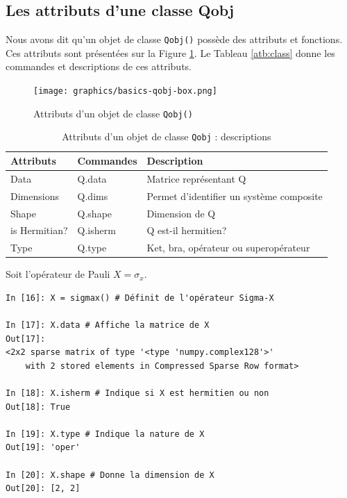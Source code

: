 \begin{itemize}
\subsection{Les attributs d'une classe Qobj}

Nous avons dit qu'un objet de classe \texttt{Qobj()} possède des attributs et 
fonctions. Ces attributs sont présentées sur la Figure \ref{fig:qobj}. Le 
Tableau \ref{atb:class} donne les commandes et descriptions de ces attributs.

\begin{figure}[htbp]
\centering
 \texttt{[image: graphics/basics-qobj-box.png]}
\caption{Attributs d'un objet de classe \texttt{Qobj()}}
\label{fig:qobj}
\end{figure}

\begin{table}[htpb]
\centering
\begin{tabular}{|l|l|l|} \hline \hline
\textbf{Attributs} &\textbf{Commandes}	&\textbf{Description}\\ \hline \hline
Data	&Q.data	&Matrice représentant Q\\ \hline
Dimensions	&Q.dims	&Permet d'identifier un système composite\\ \hline
Shape	&Q.shape	&Dimension de Q\\ \hline
is Hermitian?	&Q.isherm	&Q est-il hermitien?\\ \hline
Type	&Q.type	&Ket, bra, opérateur ou superopérateur\\ \hline
\end{tabular}
\caption{Attributs d'un objet de classe \texttt{Qobj} : descriptions}
\label{tab:class}
\end{table}

\begin{example}
Soit l'opérateur de Pauli $X=\sigma_x$.\\
\begin{lstlisting}
In [16]: X = sigmax() # Définit de l'opérateur Sigma-X

In [17]: X.data # Affiche la matrice de X
Out[17]: 
<2x2 sparse matrix of type '<type 'numpy.complex128'>'
	with 2 stored elements in Compressed Sparse Row format>

In [18]: X.isherm # Indique si X est hermitien ou non
Out[18]: True

In [19]: X.type # Indique la nature de X
Out[19]: 'oper'

In [20]: X.shape # Donne la dimension de X
Out[20]: [2, 2]
\end{lstlisting}
\end{example}


\end{itemize}

